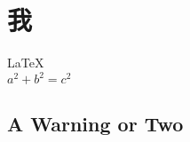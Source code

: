 \documentclass{article}
\begin{document}
               
 
\section{我}          
\LaTeX \,\\ 
 $a^2+b^2=c^2$

\subsection{A Warning or Two}  

\end{document}
